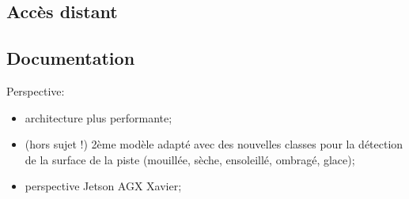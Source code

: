 \subsection{Accès distant}
\subsection{Documentation}

\par Perspective: 
\begin{itemize}
   \item architecture plus performante;
   \item (hors sujet !) 2ème modèle adapté avec des nouvelles classes pour la détection de la surface de la piste (mouillée, sèche, ensoleillé, ombragé, glace);
   \item perspective Jetson AGX Xavier;
\end{itemize}
